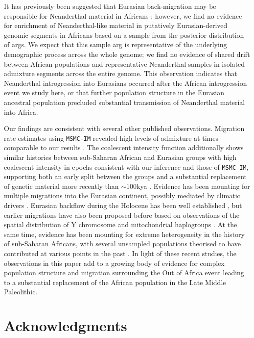 It has previously been suggested that Eurasian back-migration may be responsible for Neanderthal material in Africans \cite{Chen2020}; however, we find no evidence for enrichment of Neanderthal-like material in putatively Eurasian-derived genomic segments in Africans based on a sample from the posterior distribution of \glspl{arg}. We expect that this sample \gls{arg} is representative of the underlying demographic process across the whole genome; we find no evidence of shared drift between African populations and representative Neanderthal samples in isolated admixture segments across the entire genome. This observation indicates that Neanderthal introgression into Eurasians occurred after the African introgression event we study here, or that further population structure in the Eurasian ancestral population precluded substantial transmission of Neanderthal material into Africa.

Our findings are consistent with several other published observations. Migration rate estimates using {\tt MSMC-IM} revealed high levels of admixture at times comparable to our results \cite{Wang2019a}. The coalescent intensity function additionally shows similar histories between sub-Saharan African and Eurasian groups with high coalescent intensity in epochs consistent with our inference and those of {\tt MSMC-IM}, supporting both an early split between the groups and a substantial replacement of genetic material more recently than $\sim100$kya \cite{Albers2019}. Evidence has been mounting for multiple migrations into the Eurasian continent, possibly mediated by climatic drivers \cite{Timmermann2016, Pagani2016}. Eurasian backflow during the Holocene has been well established \cite{Lopez2015, GallegoLlorente2015}, but earlier migrations have also been proposed before based on observations of the spatial distribution of Y chromosome and mitochondrial haplogroups \cite{Altheide1997, Hammer1998, Cruciani2002, Chandrasekar2007, Cabrera2018, Hervella2016, Haber2019}. At the same time, evidence has been mounting for extreme heterogeneity in the history of sub-Saharan Africans, with several unsampled populations theorised to have contributed at various points in the past \cite{Lipson2019, Durvasula2019, Speidel2019}. In light of these recent studies, the observations in this paper add to a growing body of evidence for complex population structure and migration surrounding the Out of Africa event leading to a substantial replacement of the African population in the Late Middle Paleolithic.  

\section{Acknowledgments}

